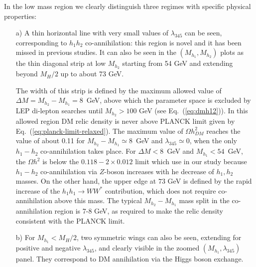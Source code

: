 \documentclass[12pt,a4paper]{article}
\begin{document}
In the low mass region we clearly distinguish three regimes with specific physical properties:
\begin{itemize}
\item[a)] A thin horizontal line with very small values of $\lambda_{345}$ can be seen, corresponding to  $h_1h_2$ co-annihilation: this region is novel and it has been missed in previous studies. 
It can also be seen in the $(M_{h_1},M_{h_2})$ plots as the thin diagonal strip at low $M_{h_2}$
starting from 54 GeV and extending beyond $M_H/2$ up to about 73 GeV.
%
%


{The width of this strip is defined by 
the maximum allowed value of $\Delta M = M_{h_2}-M_{h_1}=8$~GeV, above which
the parameter space is excluded by LEP di-lepton searches until $M_{h_2} > 100$ GeV (see Eq.~(\ref{eq:dmh12})). 
In this allowed region DM relic density is never above PLANCK limit given by Eq.~(\ref{eq:planck-limit-relaxed}).
The maximum value of $\Omega h^2_{DM}$ reaches
the value of about 0.11 for  $M_{h_2}-M_{h_1} \simeq 8$~GeV
and $\lambda_{345}\simeq 0$, when the only 
${h}_1-{h}_2$ co-annihilation takes place.
For  $\Delta M<8$~GeV
and $M_{h_1}<54$~GeV, the $\Omega h^2$ is below the $0.118-2\times0.012$ limit which use in our study
because ${h}_1-{h}_2$ co-annihilation via $Z$-boson increases 
with  he decrease of ${h}_1,{h}_2$ masses.
On the other hand, the upper edge
at $73$ GeV is defined by the rapid increase of the  $h_1 h_1 \to W W^*$ contribution,
which does not require co-annihilation above this mass. The typical $M_{h_2}-M_{h_1}$
mass split in the co-annihilation region is 7-8 GeV, as required to make the relic density 
consistent with the PLANCK limit.
}

\item[b)] For $M_{h_1}< M_H/2$, two symmetric wings can also be seen, extending for positive and negative $\lambda_{345}$, and 
clearly visible in the zoomed $(M_{h_1},\lambda_{345})$ panel. They correspond to DM annihilation via the Higgs boson exchange. 


\end{itemize}
\end{document}
